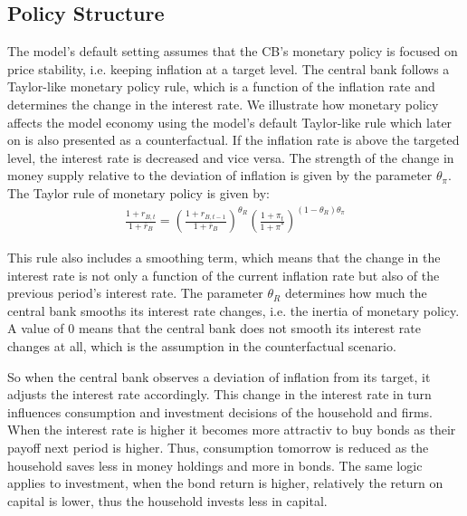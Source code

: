 \documentclass[12pt]{article}
\begin{document}
\subsection*{Policy Structure}
The model's default setting assumes that the CB's monetary policy is focused on price stability, i.e. keeping inflation at a target level. The central bank
follows a Taylor-like monetary policy rule, which is a function of the inflation rate and determines the change in the interest rate. We illustrate how monetary policy affects the model economy using the model's default Taylor-like rule which later on is also presented as a counterfactual. If the inflation rate is above the targeted level, the interest rate is decreased and vice versa. The strength of the change in money supply relative to the deviation of inflation is given by the parameter $\theta_{\pi}$. 
The Taylor rule of monetary policy is given by:
\begin{align}
    \frac{1 + r_{B,t}}{1 + \bar{r}_B} = \left( \frac{1 + r_{B,t-1}}{1 + \bar{r}_B} \right)^{\theta_R} \left( \frac{1 + \pi_t}{1 + \pi^*} \right)^{(1 - \theta_R)\theta_{\pi}}
\end{align}

This rule also includes a smoothing term, which means that the change in the interest rate is not only a function of the current inflation rate but also of the previous period's interest rate. The parameter $\theta_R$ determines how much the central bank smooths its interest rate changes, i.e. the inertia of monetary policy. A value of 0 means that the central bank does not smooth its interest rate changes at all, which is the assumption in the counterfactual scenario. 

So when the central bank observes a deviation of inflation from its target, it adjusts the interest rate accordingly. This change in the interest rate in turn influences consumption and investment decisions of the household and firms. When the interest rate is higher it becomes more attractiv to buy bonds as their payoff next period is higher. Thus, consumption tomorrow is reduced as the household saves less in money holdings and more in bonds. The same logic applies to investment, when the bond return is higher, relatively the return on capital is lower, thus the household invests less in capital.
\end{document}
